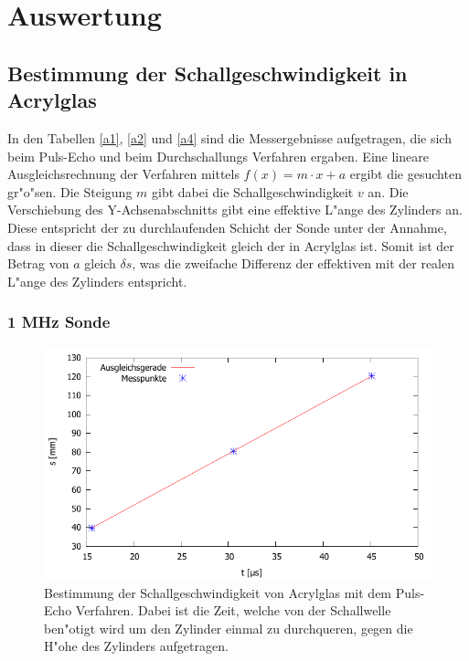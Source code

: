 \section{Auswertung}
\label{sec:auswertung}

\subsection{Bestimmung der Schallgeschwindigkeit in Acrylglas} %
\label{sub:bestimmung_der_schallgeschwindigkeit_in_acrylglas}





In den Tabellen \ref{a1}, \ref{a2} und \ref{a4} sind die Messergebnisse aufgetragen, die sich beim Puls-Echo und beim Durchschallungs Verfahren ergaben.
Eine lineare Ausgleichsrechnung der Verfahren mittels $f(x) = m \cdot x + a$ ergibt die gesuchten gr"o"sen. Die Steigung $m$ gibt dabei die Schallgeschwindigkeit $v$ an. Die Verschiebung des Y-Achsenabschnitts gibt eine effektive L"ange des Zylinders an. Diese entspricht der zu durchlaufenden Schicht der Sonde unter der Annahme, dass in dieser die Schallgeschwindigkeit gleich der in Acrylglas ist. Somit ist der Betrag von $a$ gleich $\delta s$, was die zweifache Differenz der effektiven mit der realen L"ange des Zylinders entspricht.

\subsubsection{1 MHz Sonde} %
\label{sub:1_mhz_sonde}

\begin{figure}[!h]
	\centering
	\includegraphics[width = 13cm]{img/a1e.pdf}
	\caption{Bestimmung der Schallgeschwindigkeit von Acrylglas mit dem Puls-Echo Verfahren. Dabei ist die Zeit, welche von der Schallwelle ben"otigt wird um den Zylinder einmal zu durchqueren, gegen die H"ohe des Zylinders aufgetragen.}
	\label{a1e}
\end{figure}

